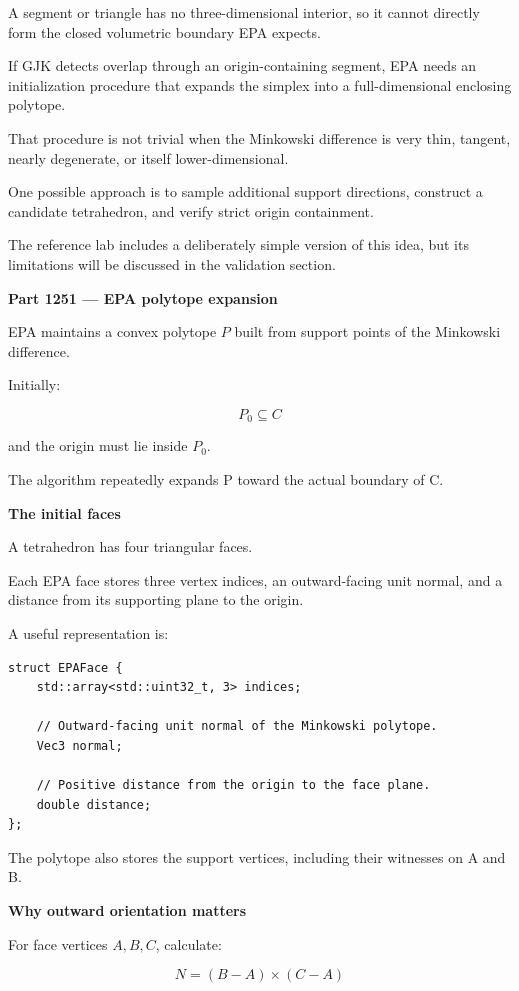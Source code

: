 A segment or triangle has no three-dimensional interior, so it cannot directly form the closed volumetric boundary EPA expects.

If GJK detects overlap through an origin-containing segment, EPA needs an initialization procedure that expands the simplex into a full-dimensional enclosing polytope.

That procedure is not trivial when the Minkowski difference is very thin, tangent, nearly degenerate, or itself lower-dimensional.

One possible approach is to sample additional support directions, construct a candidate tetrahedron, and verify strict origin containment.

The reference lab includes a deliberately simple version of this idea, but its limitations will be discussed in the validation section.

\textbf{Part 1251 --- EPA polytope expansion}

EPA maintains a convex polytope \(P\) built from support points of the Minkowski difference.

Initially:

\[
P_0\subseteq C
\]

and the origin must lie inside \(P_0\).

The algorithm repeatedly expands P toward the actual boundary of C.

\textbf{The initial faces}

A tetrahedron has four triangular faces.

Each EPA face stores three vertex indices, an outward-facing unit normal, and a distance from its supporting plane to the origin.

A useful representation is:

\begin{verbatim}
struct EPAFace {
    std::array<std::uint32_t, 3> indices;

    // Outward-facing unit normal of the Minkowski polytope.
    Vec3 normal;

    // Positive distance from the origin to the face plane.
    double distance;
};
\end{verbatim}

The polytope also stores the support vertices, including their witnesses on A and B.

\textbf{Why outward orientation matters}

For face vertices \(A,B,C\), calculate:

\[
N=(B-A)\times(C-A)
\]

